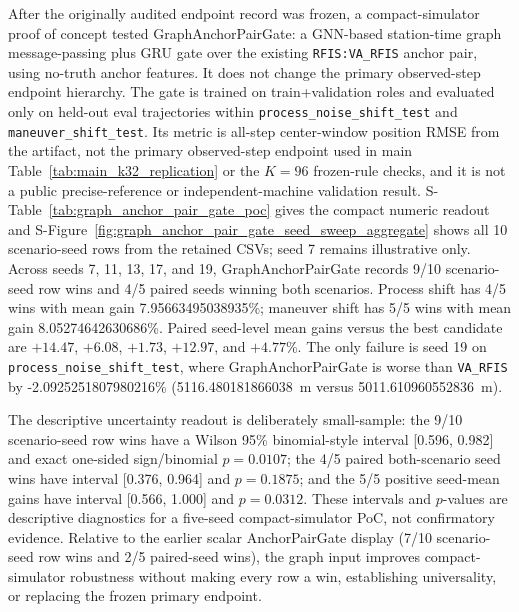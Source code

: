 \documentclass{article}
\begin{document}
After the originally audited endpoint record was frozen, a compact-simulator proof of concept tested GraphAnchorPairGate: a GNN-based station-time graph message-passing plus GRU gate over the existing \texttt{RFIS:VA\_RFIS} anchor pair, using no-truth anchor features. It does not change the primary observed-step endpoint hierarchy. The gate is trained on train+validation roles and evaluated only on held-out eval trajectories within \texttt{process\_noise\_shift\_test} and \texttt{maneuver\_shift\_test}. Its metric is all-step center-window position RMSE from the artifact, not the primary observed-step endpoint used in main Table~\ref{tab:main_k32_replication} or the $K=96$ frozen-rule checks, and it is not a public precise-reference or independent-machine validation result. S-Table~\ref{tab:graph_anchor_pair_gate_poc} gives the compact numeric readout and S-Figure~\ref{fig:graph_anchor_pair_gate_seed_sweep_aggregate} shows all 10 scenario-seed rows from the retained CSVs; seed 7 remains illustrative only. Across seeds 7, 11, 13, 17, and 19, GraphAnchorPairGate records 9/10 scenario-seed row wins and 4/5 paired seeds winning both scenarios. Process shift has 4/5 wins with mean gain 7.95663495038935\%; maneuver shift has 5/5 wins with mean gain 8.05274642630686\%. Paired seed-level mean gains versus the best candidate are \(+14.47\), \(+6.08\), \(+1.73\), \(+12.97\), and \(+4.77\)\%. The only failure is seed 19 on \texttt{process\_noise\_shift\_test}, where GraphAnchorPairGate is worse than \texttt{VA\_RFIS} by -2.0925251807980216\% (5116.480181866038~m versus 5011.610960552836~m).

The descriptive uncertainty readout is deliberately small-sample: the 9/10 scenario-seed row wins have a Wilson 95\% binomial-style interval [0.596, 0.982] and exact one-sided sign/binomial \(p=0.0107\); the 4/5 paired both-scenario seed wins have interval [0.376, 0.964] and \(p=0.1875\); and the 5/5 positive seed-mean gains have interval [0.566, 1.000] and \(p=0.0312\). These intervals and \(p\)-values are descriptive diagnostics for a five-seed compact-simulator PoC, not confirmatory evidence. Relative to the earlier scalar AnchorPairGate display (7/10 scenario-seed row wins and 2/5 paired-seed wins), the graph input improves compact-simulator robustness without making every row a win, establishing universality, or replacing the frozen primary endpoint.
\end{document}
